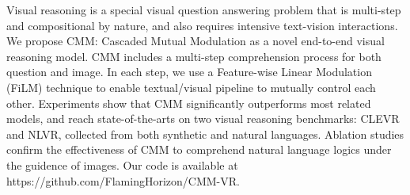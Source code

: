 Visual reasoning is a special visual question answering problem that is multi-step and compositional by nature, and also requires intensive text-vision interactions. We propose CMM: Cascaded Mutual Modulation as a novel end-to-end visual reasoning model. CMM includes a multi-step comprehension process for both question and image. In each step, we use a Feature-wise Linear Modulation (FiLM) technique to enable textual/visual pipeline to mutually control each other. Experiments show that CMM significantly outperforms most related models, and reach state-of-the-arts on two visual reasoning benchmarks: CLEVR and NLVR, collected from both synthetic and natural languages. Ablation studies confirm the effectiveness of CMM to comprehend natural language logics under the guidence of images. Our code is available at https://github.com/FlamingHorizon/CMM-VR.
